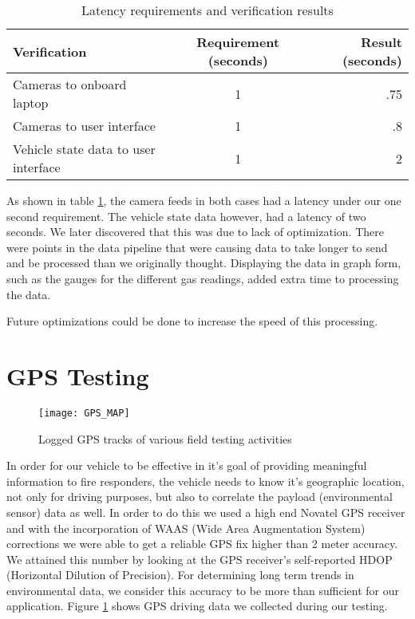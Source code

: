\begin{table}[ht]
    \centering
    \begin{tabular}{ l | c | r }
      Verification & Requirement (seconds) & Result (seconds) \\ \hline
      Cameras to onboard laptop & 1 & .75 \\
      Cameras to user interface & 1 & .8 \\
      Vehicle state data to user interface & 1 & 2 \\
    \end{tabular}
    \caption{Latency requirements and verification results}
    \label{table:latency_verification}
\end{table}

As shown in table \ref{table:latency_verification}, the camera feeds in both cases had a latency under our one second requirement.  The vehicle state data however, had a latency of two seconds.  We later discovered that this was due to lack of optimization.  There were points in the data pipeline that were causing data to take longer to send and be processed than we originally thought.  Displaying the data in graph form, such as the gauges for the different gas readings, added extra time to processing the data.

Future optimizations could be done to increase the speed of this processing.

\section{GPS Testing}
\begin{figure}[H]
	\centerline{\texttt{[image: GPS\_MAP]}}
	\caption[]{Logged GPS tracks of various field testing activities}
	\label{fig:GPSMAP}
\end{figure}

In order for our vehicle to be effective in it's goal of providing meaningful information to fire responders, the vehicle needs to know it's geographic location, not only for driving purposes, but also to correlate the payload (environmental sensor) data as well. In order to do this we used a high end Novatel GPS receiver and with the incorporation of WAAS (Wide Area Augmentation System) corrections we were able to get a reliable GPS fix higher than 2 meter accuracy. We attained this number by looking at the GPS receiver's self-reported HDOP (Horizontal Dilution of Precision). For determining long term trends in environmental data, we consider this accuracy to be more than sufficient for our application. Figure \ref{fig:GPSMAP} shows GPS driving data we collected during our testing. 

